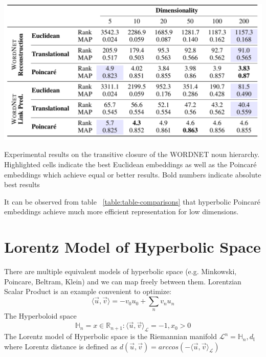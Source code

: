 \begin{table}[htb]
  \centering
    \includegraphics[width=\textwidth]{figs/1-3.png}
    \caption{Experimental results on the transitive closure of the WORDNET noun hierarchy. Highlighted cells indicate the best Euclidean embeddings as well as the Poincaré embeddings which achieve equal or better results. Bold numbers indicate absolute best results}
    \label{table:table-comparisons}
\end{table}

It can be observed from table  ~\ref{table:table-comparisons} that hyperbolic Poincaré embeddings achieve much more efficient representation for low dimensions. 

\section{Lorentz Model of Hyperbolic Space}

There are multiple equivalent models of hyperbolic space (e.g. Minkowski, Poincare, Beltram, Klein) and we can map freely between them. Lorentzian Scalar Product is an example convenient to optimize:
\begin{equation} \label{eq:riemmaniansdg3}
         \langle \vec{u},\vec{v} \rangle = -v_0 u_0 + \sum_n v_n u_n
\end{equation}  
The Hyperboloid space 
\begin{equation} \label{eq:riemmaniansdg4}
         \mathbb{H}_n = {x \in \mathbb{R}_{n+1}:\langle \vec{u},\vec{v} \rangle_{ \mathcal{L}}= -1, x_0 > 0 }
\end{equation}  
The Lorentz model of Hyperbolic space is the Riemannian manifold  $\mathcal{L}^n =  \mathbb{H}_n , d_{\mathbb{l}}$
where Lorentz distance is defined as $d(\vec{u},\vec{v}) = arccos (-\langle \vec{u},\vec{v} \rangle_{ \mathcal{L}}) $

